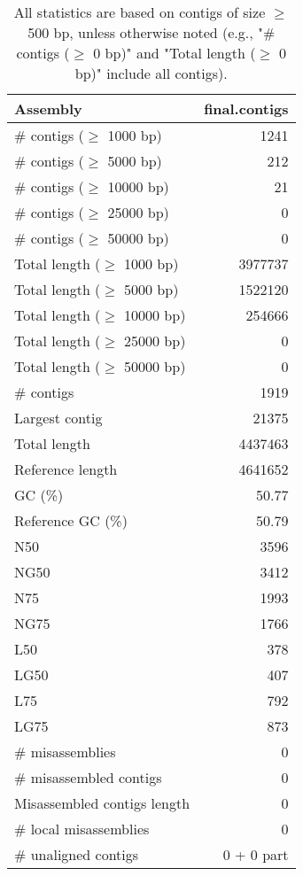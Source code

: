 \documentclass[12pt,a4paper]{article}
\begin{document}
\begin{table}[ht]
\begin{center}
\caption{All statistics are based on contigs of size $\geq$ 500 bp, unless otherwise noted (e.g., "\# contigs ($\geq$ 0 bp)" and "Total length ($\geq$ 0 bp)" include all contigs).}
\begin{tabular}{|l*{1}{|r}|}
\hline
Assembly & final.contigs \\ \hline
\# contigs ($\geq$ 1000 bp) & 1241 \\ \hline
\# contigs ($\geq$ 5000 bp) & 212 \\ \hline
\# contigs ($\geq$ 10000 bp) & 21 \\ \hline
\# contigs ($\geq$ 25000 bp) & 0 \\ \hline
\# contigs ($\geq$ 50000 bp) & 0 \\ \hline
Total length ($\geq$ 1000 bp) & 3977737 \\ \hline
Total length ($\geq$ 5000 bp) & 1522120 \\ \hline
Total length ($\geq$ 10000 bp) & 254666 \\ \hline
Total length ($\geq$ 25000 bp) & 0 \\ \hline
Total length ($\geq$ 50000 bp) & 0 \\ \hline
\# contigs & 1919 \\ \hline
Largest contig & 21375 \\ \hline
Total length & 4437463 \\ \hline
Reference length & 4641652 \\ \hline
GC (\%) & 50.77 \\ \hline
Reference GC (\%) & 50.79 \\ \hline
N50 & 3596 \\ \hline
NG50 & 3412 \\ \hline
N75 & 1993 \\ \hline
NG75 & 1766 \\ \hline
L50 & 378 \\ \hline
LG50 & 407 \\ \hline
L75 & 792 \\ \hline
LG75 & 873 \\ \hline
\# misassemblies & 0 \\ \hline
\# misassembled contigs & 0 \\ \hline
Misassembled contigs length & 0 \\ \hline
\# local misassemblies & 0 \\ \hline
\# unaligned contigs & 0 + 0 part \\ \hline

\end{tabular}
\end{center}
\end{table}
\end{document}

